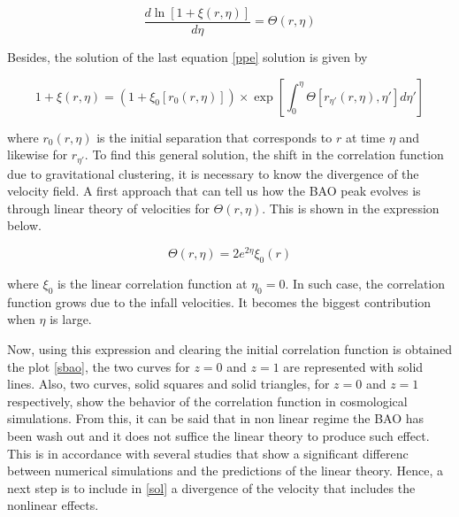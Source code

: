 \begin{equation}
\frac{d \ln [1+\xi(r,\eta)]}{d\eta} = \Theta(r,\eta)
\label{ppe}
\end{equation}

Besides, the solution of the last equation \ref{ppe} solution is given by 

\begin{equation}
1 + \xi(r,\eta) = (1+\xi_0[r_0(r,\eta)])\times \exp\left[\int_0^\eta \Theta[r_{\eta'}(r,\eta),\eta']d\eta'\right]
\label{sol}
\end{equation}

where $r_0(r,\eta)$ is the initial separation that corresponds to $r$ at time $\eta$ and likewise
for $r_{\eta'}$. To find this general solution, the shift in the correlation function due to 
gravitational clustering, it is necessary to know the divergence of the velocity field. 
A first approach that can tell us how the BAO peak evolves is through  linear theory of 
velocities for $\Theta(r,\eta)$. This is shown in the expression below. 

\begin{equation}
\Theta(r,\eta) = 2e^{2\eta}\xi_0(r)
\label{linb}
\end{equation}

where $\xi_0$ is the linear correlation function at $\eta_0=0$. In such case, the correlation
function grows due to the infall velocities. It becomes the biggest contribution when $\eta$ is
large. 

Now, using this expression and clearing the initial correlation function is obtained the 
plot \ref{sbao}, the two curves for $z=0$ and $z=1$ are represented with solid lines. 
Also, two curves, solid squares and solid triangles, for $z=0$ and $z=1$ respectively, show the 
behavior of the correlation function in cosmological simulations. From this, it
can be said that in non linear regime the BAO has been wash out and it does not 
suffice the linear theory to produce such effect. This is in accordance with several 
studies that show a significant differenc between numerical simulations and the predictions
of the linear theory. 
Hence, a next step is to include in \ref{sol} a divergence of the velocity that
includes the nonlinear effects. 


